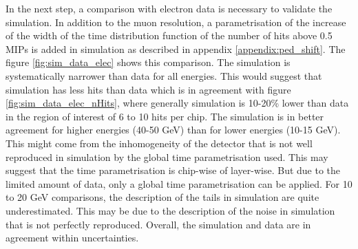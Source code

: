 \documentclass[twoside,a4paper,11pt]{article}
\begin{document}
In the next step, a comparison with electron data is necessary to validate the simulation. In addition to the muon resolution, a parametrisation of the increase of the width of the time distribution function of the number of hits above 0.5 MIPs is added in simulation as described in appendix \ref{appendix:ped_shift}. The figure \ref{fig:sim_data_elec} shows this comparison. The simulation is systematically narrower than data for all energies. This would suggest that simulation has less hits than data which is in agreement with figure \ref{fig:sim_data_elec_nHits}, where generally simulation is 10-20\% lower than data in the region of interest of 6 to 10 hits per chip. The simulation is in better agreement for higher energies (40-50 GeV) than for lower energies (10-15 GeV). This might come from the inhomogeneity of the detector that is not well reproduced in simulation by the global time parametrisation used. This may suggest that the time parametrisation is chip-wise of layer-wise. But due to the limited amount of data, only a global time parametrisation can be applied. For 10 to 20 GeV comparisons, the description of the tails in simulation are quite underestimated. This may be due to the description of the noise in simulation that is not perfectly reproduced. Overall, the simulation and data are in agreement within uncertainties.
\end{document}

